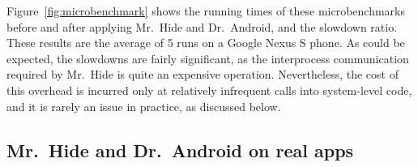 \documentclass[preprint]{sig-alternate-10pt}
\newcommand{\lib}{Mr.\ Hide\xspace}
\newcommand{\rewriter}{Dr.\ Android\xspace}
\begin{document}
Figure~\ref{fig:microbenchmark} shows the running times of these
microbenchmarks before and after applying \lib{} and \rewriter{}, and
the slowdown ratio.  These results are the average of 5 runs on a
Google Nexus S phone. As could be expected, the slowdowns are
fairly significant, as the interprocess communication required by \lib
is quite an expensive operation. Nevertheless, the cost of this overhead is
incurred only at relatively infrequent calls into system-level code, and
it is rarely an issue in
practice, as discussed below.

\subsection{\lib and \rewriter on real apps}

\begin{figure}[t!]
\newcommand{\amazon}{Amazon}
\newcommand{\angrybirds}{Angry Birds}
\newcommand{\angrybirdsrio}{Angry Birds Rio}
\newcommand{\astro}{ASTRO}
\newcommand{\barcode}{Barcode (zxing)}
\newcommand{\bubbleblast}{Bubble Blast}
\newcommand{\bubbleblasttwo}{Bubble Blast 2}
\newcommand{\dropbox}{Dropbox}
\newcommand{\espn}{ESPN ScoreCenter}
\newcommand{\flashone}{Flashlight}
\newcommand{\flashtwo}{Brightest Flashlight}
\newcommand{\freemusic}{FreeMusic}
\newcommand{\gasbuddy}{Gas Buddy}
\newcommand{\horoscope}{Horoscope}
\newcommand{\mpring}{MP3 Ringtone}
\newcommand{\shazam}{Shazam}
\newcommand{\stardroid}{Google Sky Map}
\newcommand{\taskkiller}{Advanced Task Killer}
\newcommand{\words}{Words With Friends}
\newcommand{\amazonAut}{--}
\newcommand{\amazonMan}{15}
\newcommand{\angrybirdsAut}{--}
\newcommand{\angrybirdsMan}{2}
\newcommand{\angrybirdsrioAut}{--}
\newcommand{\angrybirdsrioMan}{2}
\newcommand{\astroAut}{13}
\newcommand{\astroMan}{17}
\newcommand{\barcodeAut}{7}
\newcommand{\barcodeMan}{8}
\newcommand{\bubbleblastAut}{6}
\newcommand{\bubbleblastMan}{8}
\newcommand{\bubbleblasttwoAut}{5}
\newcommand{\bubbleblasttwoMan}{12}
\newcommand{\dropboxAut}{8}
\newcommand{\dropboxMan}{6}
\newcommand{\espnAut}{--}
\newcommand{\espnMan}{4}
\newcommand{\flashoneAut}{--}
\newcommand{\flashoneMan}{1} 
\newcommand{\flashtwoAut}{--}
\newcommand{\flashtwoMan}{1} 
\newcommand{\freemusicAut}{--}
\newcommand{\freemusicMan}{6}
\newcommand{\gasbuddyAut}{15}
\newcommand{\gasbuddyMan}{13}
\newcommand{\horoscopeAut}{--}
\newcommand{\horoscopeMan}{11}
\newcommand{\mpringAut}{--}
\newcommand{\mpringMan}{7}
\newcommand{\shazamAut}{10}
\newcommand{\shazamMan}{10}
\newcommand{\stardroidAut}{4}
\newcommand{\stardroidMan}{5}

\end{figure}
\end{document}
